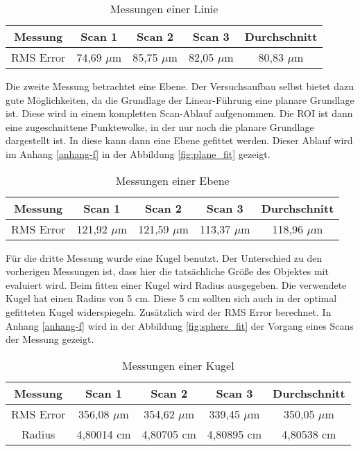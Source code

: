 		\begin{table}[h]
			\centering
			
			\begin{tabular}[h]{c|c|c|c||c}
				Messung & Scan 1 & Scan 2 & Scan 3 & Durchschnitt \\
				\hline
				RMS Error & 74,69 $\mu$m & 85,75 $\mu$m & 82,05 $\mu$m & 80,83 $\mu$m \\
				\hline
			\end{tabular}
		
			\caption{Messungen einer Linie}
			\label{tab:linie}
			
		\end{table}
	
		Die zweite Messung betrachtet eine Ebene. Der Versuchsaufbau selbst bietet dazu gute Möglichkeiten, da die Grundlage der Linear-Führung eine planare Grundlage ist. Diese wird in einem kompletten Scan-Ablauf aufgenommen. Die ROI ist dann eine zugeschnittene Punktewolke, in der nur noch die planare Grundlage dargestellt ist. In diese kann dann eine Ebene gefittet werden. Dieser Ablauf wird im Anhang \ref{anhang-f} in der Abbildung \ref{fig:plane_fit} gezeigt.
		
		\begin{table}[h]
			\centering
			
			\begin{tabular}[h]{c|c|c|c||c}
				Messung & Scan 1 & Scan 2 & Scan 3 & Durchschnitt \\
				\hline
				RMS Error & 121,92 $\mu$m & 121,59 $\mu$m & 113,37 $\mu$m & 118,96 $\mu$m \\
				\hline
			\end{tabular}
		
			\caption{Messungen einer Ebene}
			\label{tab:ebene}
			
		\end{table}
	
		Für die dritte Messung wurde eine Kugel benutzt. Der Unterschied zu den vorherigen Messungen ist, dass hier die tatsächliche Größe des Objektes mit evaluiert wird. Beim fitten einer Kugel wird Radius ausgegeben. Die verwendete Kugel hat einen Radius von 5 cm. Diese 5 cm sollten sich auch in der optimal gefitteten Kugel widerspiegeln. Zusätzlich wird der RMS Error berechnet. In Anhang \ref{anhang-f} wird in der Abbildung \ref{fig:sphere_fit} der Vorgang eines Scans der Messung gezeigt.
	
		\begin{table}[h]
			\centering
			
			\begin{tabular}[h]{c|c|c|c||c}
				Messung & Scan 1 & Scan 2 & Scan 3 & Durchschnitt \\
				\hline
				RMS Error & 356,08 $\mu$m & 354,62 $\mu$m & 339,45 $\mu$m & 350,05 $\mu$m \\
				\hline
				Radius & 4,80014 cm & 4,80705 cm & 4,80895 cm & 4,80538 cm \\
				\hline
			\end{tabular}
		
			\caption{Messungen einer Kugel}
			\label{tab:sphere}
			
		\end{table}
	
